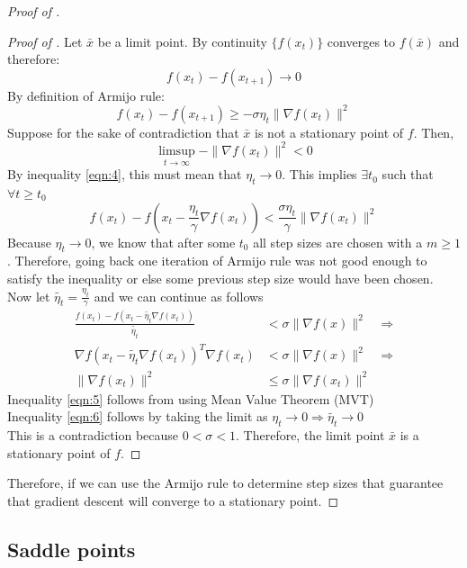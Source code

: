 \begin{proof}[Proof of ]
\begin{proof}[Proof of ]
Let $\bar{x}$ be a limit point. By continuity $\{f(x_t)\}$ converges to $f(\bar{x})$ and therefore:
\[
    f(x_t) - f(x_{t+1}) \to 0
\]
By definition of Armijo rule:
\begin{equation}
    f(x_t) - f(x_{t+1}) \ge -\sigma \eta_t \|\nabla f(x_t)\|^2 \label{eqn:4}
\end{equation}
Suppose for the sake of contradiction that $\bar{x}$ is not a stationary point of $f$. Then,
\[
    \limsup_{t \to \infty} -\|\nabla f(x_t)\|^2 < 0
\]
By inequality \ref{eqn:4}, this must mean that $\eta_t \to 0$. This implies $\exists t_0$ such that $\forall t \ge t_0$
\[
    f(x_t) - f(x_t - \frac{\eta_t}{\gamma} \nabla f(x_t)) < \frac{\sigma \eta_t}{\gamma} \|\nabla f(x_t)\|^2
\]
Because $\eta_t \to 0$, we know that after some $t_0$ all step sizes are chosen with a $m\ge 1$. Therefore, going back one iteration of Armijo rule was not good enough to satisfy the inequality or else some previous step size would have been chosen.\\
\newline
Now let $\tilde{\eta_t} = \frac{\eta_t}{\gamma}$ and we can continue as follows
\begin{align}
    \frac{f(x_t) - f(x_t - \tilde{\eta_t} \nabla f(x_t))}{\tilde{\eta_t}} &< \sigma \|\nabla f(x)\|^2 &\Rightarrow \nonumber\\
    \nabla f(x_t - \tilde{\eta_t} \nabla f(x_t))^T \nabla f(x_t) &< \sigma \|\nabla f(x)\|^2 &\Rightarrow \label{eqn:5}\\
    \|\nabla f(x_t) \|^2 &\le \sigma \|\nabla f(x_t) \|^2 & \label{eqn:6}
\end{align}
\newline
Inequality \ref{eqn:5} follows from using Mean Value Theorem (MVT)\\
Inequality \ref{eqn:6} follows by taking the limit as $\eta_t \to 0 \Rightarrow \tilde{\eta_t} \to 0$\\
\newline
This is a contradiction because $0 < \sigma < 1$. Therefore, the limit point $\bar{x}$ is a stationary point of $f$.
\end{proof}
Therefore, if we can use the Armijo rule to determine step sizes that guarantee that gradient descent will converge to a stationary point.
\end{proof}

\subsection{Saddle points}

